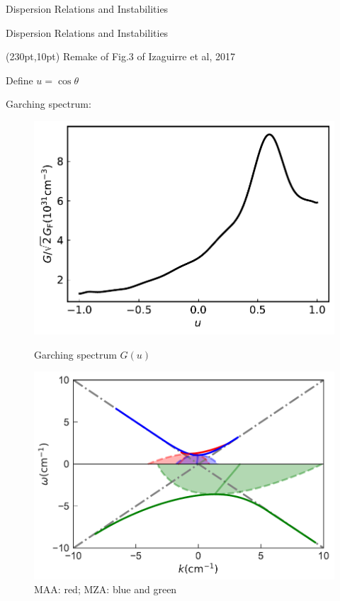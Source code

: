 \documentclass[9pt]{beamer}
\begin{document}
\begin{darkframes}
\begin{frame}{Dispersion Relations and Instabilities}
\end{frame}



\begin{frame}{Dispersion Relations and Instabilities}


       \begin{textblock*}{100pt}(230pt,10pt)
           Remake of Fig.3 of Izaguirre et al, 2017
       \end{textblock*}

Define $u=\cos\theta$

Garching spectrum:

   \begin{figure}
        \includegraphics[width=\linewidth]{assets/dr/spectGarchingPlt.pdf}
        \caption*{Garching spectrum $G(u)$}
      \endminipage\hfill
      \includegraphics[width=\linewidth]{assets/dr/spectGarchingDRLSAPltBlob.pdf}
      \caption*{ MAA: red; MZA: blue and green }
      \endminipage\hfill
   \end{figure}


\end{frame}
\end{darkframes}
\end{document}
